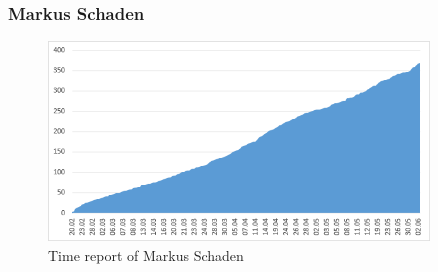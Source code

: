 \subsubsection{Markus Schaden}
\begin{figure}[H]
	\centering
	\includegraphics[width=0.9\textwidth]{img/timereport_ms}
	\caption{Time report of Markus Schaden}
	\label{fig:timereport_markus_schaden}
\end{figure}

